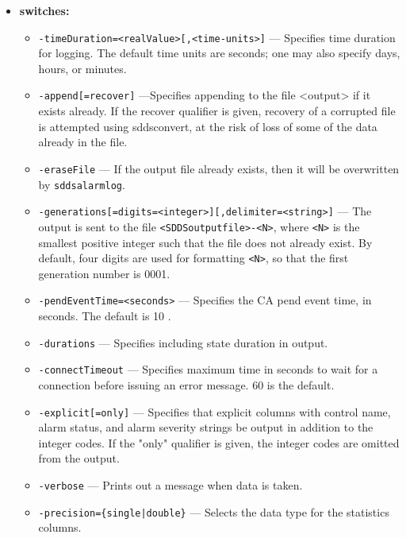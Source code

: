\begin{itemize}
%
\item {\bf switches:}
%
%
    \begin{itemize}
%
%
        \item {\tt -timeDuration=<realValue>[,<time-units>]} ---  Specifies time duration for logging.
                The default time units are seconds; one may also specify days, hours, or minutes.
        \item {\tt -append[=recover]} ---Specifies appending to the file <output> if it exists already.
                If the recover qualifier is given, recovery of a corrupted file
                is attempted using sddsconvert, at the risk of loss of some of the
                data already in the file.
        \item {\tt -eraseFile} --- If the output file already exists, then it will be overwritten
                by \verb+sddsalarmlog+.
        \item {\verb+-generations[=digits=<integer>][,delimiter=<string>]+} ---
                The output is sent to the file \verb+<SDDSoutputfile>-<N>+, where \verb+<N>+ is
                   the smallest positive integer such that the file does not already
                   exist.   By default, four digits are used for formatting \verb+<N>+, so that
                   the first generation number is 0001.
        \item {\tt -pendEventTime=<seconds>} --- Specifies the CA pend event time, in seconds.
                The default is 10 .
        \item {\tt -durations} --- Specifies including state duration in output.
        \item {\tt -connectTimeout} --- Specifies maximum time in seconds to wait for a connection before
                issuing an error message. 60 is the default.
        \item {\tt -explicit[=only]} ---  Specifies that explicit columns with control name, alarm status,
                and alarm severity strings be output in addition to the integer
                codes.  If the "only" qualifier is given, the integer codes are
                omitted from the output.
        \item {\tt -verbose} --- Prints out a message when data is taken.
        \item {\tt -precision=\{single|double\}} --- Selects the data type for the statistics columns.

\end{itemize}
\end{itemize}
